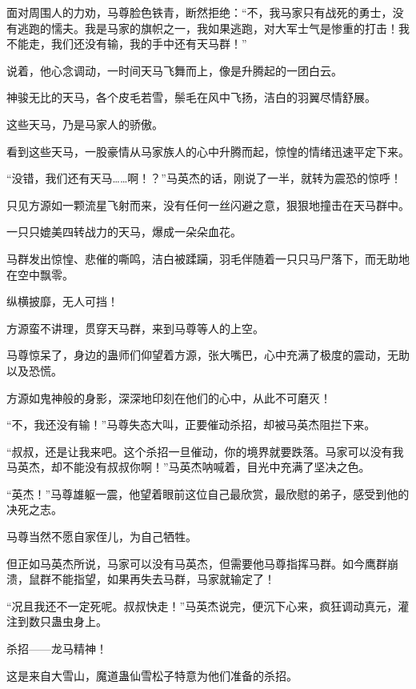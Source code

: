 
\begin{this_body}

面对周围人的力劝，马尊脸色铁青，断然拒绝：“不，我马家只有战死的勇士，没有逃跑的懦夫。我是马家的旗帜之一，我如果逃跑，对大军士气是惨重的打击！我不能走，我们还没有输，我的手中还有天马群！”

说着，他心念调动，一时间天马飞舞而上，像是升腾起的一团白云。

神骏无比的天马，各个皮毛若雪，鬃毛在风中飞扬，洁白的羽翼尽情舒展。

这些天马，乃是马家人的骄傲。

看到这些天马，一股豪情从马家族人的心中升腾而起，惊惶的情绪迅速平定下来。

“没错，我们还有天马……啊！？”马英杰的话，刚说了一半，就转为震恐的惊呼！

只见方源如一颗流星飞射而来，没有任何一丝闪避之意，狠狠地撞击在天马群中。

一只只媲美四转战力的天马，爆成一朵朵血花。

马群发出惊惶、悲催的嘶鸣，洁白被蹂躏，羽毛伴随着一只只马尸落下，而无助地在空中飘零。

纵横披靡，无人可挡！

方源蛮不讲理，贯穿天马群，来到马尊等人的上空。

马尊惊呆了，身边的蛊师们仰望着方源，张大嘴巴，心中充满了极度的震动，无助以及恐慌。

方源如鬼神般的身影，深深地印刻在他们的心中，从此不可磨灭！

“不，我还没有输！”马尊失态大叫，正要催动杀招，却被马英杰阻拦下来。

“叔叔，还是让我来吧。这个杀招一旦催动，你的境界就要跌落。马家可以没有我马英杰，却不能没有叔叔你啊！”马英杰呐喊着，目光中充满了坚决之色。

“英杰！”马尊雄躯一震，他望着眼前这位自己最欣赏，最欣慰的弟子，感受到他的决死之志。

马尊当然不愿自家侄儿，为自己牺牲。

但正如马英杰所说，马家可以没有马英杰，但需要他马尊指挥马群。如今鹰群崩溃，鼠群不能指望，如果再失去马群，马家就输定了！

“况且我还不一定死呢。叔叔快走！”马英杰说完，便沉下心来，疯狂调动真元，灌注到数只蛊虫身上。

杀招——龙马精神！

这是来自大雪山，魔道蛊仙雪松子特意为他们准备的杀招。


\end{this_body}
